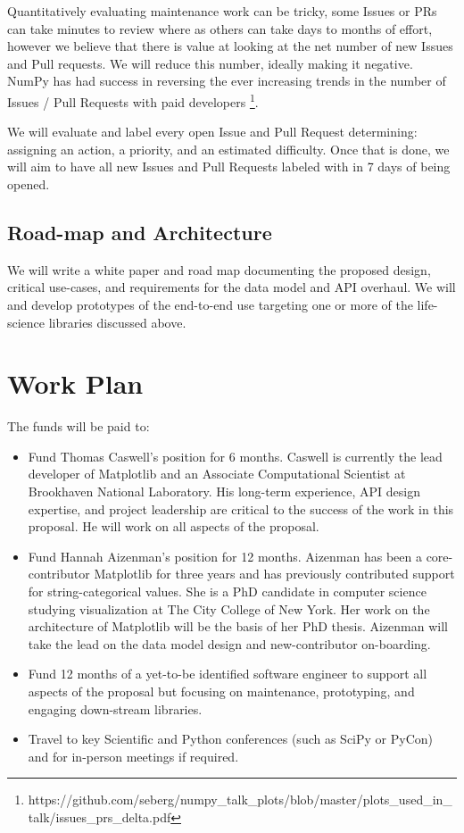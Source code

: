 \documentclass[11pt]{article}  %
\begin{document}
Quantitatively evaluating maintenance work can be tricky, some Issues
or PRs can take minutes to review where as others can take days to
months of effort, however we believe that there is value at looking at
the net number of new Issues and Pull requests.  We will reduce this
number, ideally making it negative.  NumPy has had success in
reversing the ever increasing trends in the number of Issues / Pull
Requests with paid
developers \footnote{https://github.com/seberg/numpy\_talk\_plots/blob/master/plots\_used\_in\_talk/issues\_prs\_delta.pdf}.


We will evaluate and label every open Issue and Pull Request
determining: assigning an action, a priority, and an estimated
difficulty.  Once that is done, we will aim to have all new Issues and
Pull Requests labeled with in 7 days of being opened.


\subsection{Road-map and Architecture}

We will write a white paper and road map documenting the proposed
design, critical use-cases, and requirements for the data model and
API overhaul.  We will and develop prototypes of the end-to-end use
targeting one or more of the life-science libraries discussed above.



\section{Work Plan}

The funds will be paid to:


\begin{itemize}

\item Fund Thomas Caswell's position for 6 months.  Caswell is
  currently the lead developer of Matplotlib and an Associate
  Computational Scientist at Brookhaven National Laboratory.  His
  long-term experience, API design expertise, and project leadership
  are critical to the success of the work in this proposal.  He will work
  on all aspects of the proposal.
\item Fund Hannah Aizenman's position for 12 months.  Aizenman has
  been a core-contributor Matplotlib for three years and has
  previously contributed support for string-categorical values.  She
  is a PhD candidate in computer science studying visualization at The
  City College of New York.  Her work on the architecture of
  Matplotlib will be the basis of her PhD thesis.  Aizenman will take
  the lead on the data model design and new-contributor on-boarding.
\item Fund 12 months of a yet-to-be identified software engineer to
  support all aspects of the proposal but focusing on maintenance,
  prototyping, and engaging down-stream libraries.
\item Travel to key Scientific and Python conferences (such as SciPy
  or PyCon) and for in-person meetings if required.
\end{itemize}
\end{document}
